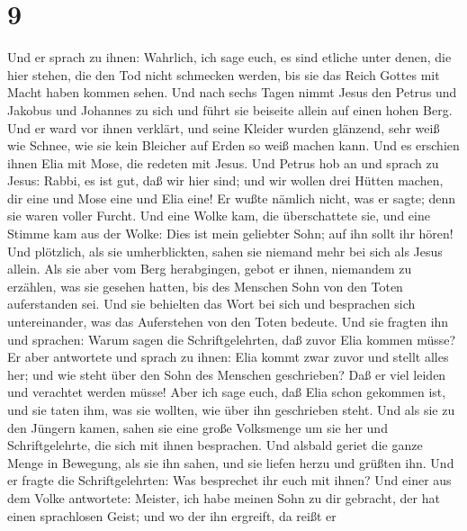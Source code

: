 \hypertarget{section-8}{%
\section{9}\label{section-8}}

 Und er sprach zu ihnen: Wahrlich, ich sage euch, es sind
etliche unter denen, die hier stehen, die den Tod nicht schmecken
werden, bis sie das Reich Gottes mit Macht haben kommen sehen.
 Und nach sechs Tagen nimmt Jesus den Petrus und Jakobus
und Johannes zu sich und führt sie beiseite allein auf einen hohen Berg.
Und er ward vor ihnen verklärt,  und seine Kleider wurden
glänzend, sehr weiß wie Schnee, wie sie kein Bleicher auf Erden so weiß
machen kann.  Und es erschien ihnen Elia mit Mose, die
redeten mit Jesus.  Und Petrus hob an und sprach zu Jesus:
Rabbi, es ist gut, daß wir hier sind; und wir wollen drei Hütten machen,
dir eine und Mose eine und Elia eine!  Er wußte nämlich
nicht, was er sagte; denn sie waren voller Furcht.  Und
eine Wolke kam, die überschattete sie, und eine Stimme kam aus der
Wolke: Dies ist mein geliebter Sohn; auf ihn sollt ihr hören!
 Und plötzlich, als sie umherblickten, sahen sie niemand
mehr bei sich als Jesus allein.  Als sie aber vom Berg
herabgingen, gebot er ihnen, niemandem zu erzählen, was sie gesehen
hatten, bis des Menschen Sohn von den Toten auferstanden sei.
 Und sie behielten das Wort bei sich und besprachen sich
untereinander, was das Auferstehen von den Toten bedeute.
 Und sie fragten ihn und sprachen: Warum sagen die
Schriftgelehrten, daß zuvor Elia kommen müsse?  Er aber
antwortete und sprach zu ihnen: Elia kommt zwar zuvor und stellt alles
her; und wie steht über den Sohn des Menschen geschrieben? Daß er viel
leiden und verachtet werden müsse!  Aber ich sage euch,
daß Elia schon gekommen ist, und sie taten ihm, was sie wollten, wie
über ihn geschrieben steht.  Und als sie zu den Jüngern
kamen, sahen sie eine große Volksmenge um sie her und Schriftgelehrte,
die sich mit ihnen besprachen.  Und alsbald geriet die
ganze Menge in Bewegung, als sie ihn sahen, und sie liefen herzu und
grüßten ihn.  Und er fragte die Schriftgelehrten: Was
besprechet ihr euch mit ihnen?  Und einer aus dem Volke
antwortete: Meister, ich habe meinen Sohn zu dir gebracht, der hat einen
sprachlosen Geist;  und wo der ihn ergreift, da reißt er
